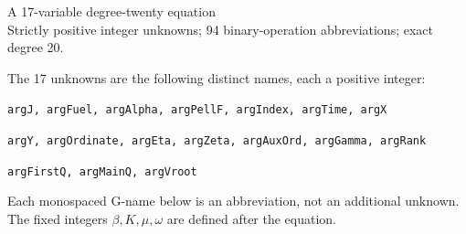 \documentclass[10pt]{article}
\begin{document}
\begin{center}{\Large A 17-variable degree-twenty equation}\\
Strictly positive integer unknowns; 94 binary-operation abbreviations; exact degree 20.
\end{center}
The 17 unknowns are the following distinct names, each a positive integer:
\par\small
\noindent\texttt{argJ, argFuel, argAlpha, argPellF, argIndex, argTime, argX}\par
\noindent\texttt{argY, argOrdinate, argEta, argZeta, argAuxOrd, argGamma, argRank}\par
\noindent\texttt{argFirstQ, argMainQ, argVroot}\par
\normalsize
Each monospaced G-name below is an abbreviation, not an additional unknown.
The fixed integers $\beta,K,\mu,\omega$ are defined after the equation.
\end{document}
